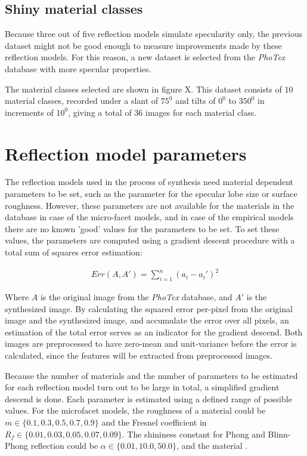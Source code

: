 \subsection{Shiny material classes}
Because three out of five reflection models simulate specularity only, the previous dataset might not be good enough to measure improvements made by these reflection models. For this reason, a new dataset is selected from the {\it PhoTex} database with more specular properties. 

The material classes selected are shown in figure X. This dataset consists of 10 material classes, recorded under a slant of $75^0$ and tilts of $0^0$ to $350^0$ in increments of $10^0$, giving a total of 36 images for each material class.


\section{Reflection model parameters}\label{sec:ParameterSetting}
The reflection models used in the process of synthesis need material dependent parameters to be set, such as the parameter for the specular lobe size or surface roughness. However, these parameters are not available for the materials in the database in case of the micro-facet models, and in case of the empirical models there are no known 'good' values for the parameters to be set. To set these values, the parameters are computed using a gradient descent procedure with a total sum of squares error estimation:

		\begin{eqnarray*}
			Err(A,A') = \sum_{i=1}^n (a_i - a_i')^2
		\end{eqnarray*}
 
Where $A$ is the original image from the {\it PhoTex} database, and $A'$ is the synthesized image. By calculating the squared error per-pixel from the original image and the synthesized image, and accumulate the error over all pixels, an estimation of the total error serves as an indicator for the gradient descend. Both images are preprocessed to have zero-mean and unit-variance before the error is calculated, since the features will be extracted from preprocessed images.

Because the number of materials and the number of parameters to be estimated for each reflection model turn out to be large in total, a simplified gradient descend is done. Each parameter is estimated using a defined range of possible values. For the microfacet models, the roughness of a material could be $m \in \{0.1, 0.3, 0.5, 0.7, 0.9\}$ and the Fresnel coefficient in $R_f \in \{0.01, 0.03, 0.05, 0.07, 0.09\}$. The shininess constant for Phong and Blinn-Phong reflection could be $\alpha \in \{0.01, 10.0, 50.0\}$, and the material . 

